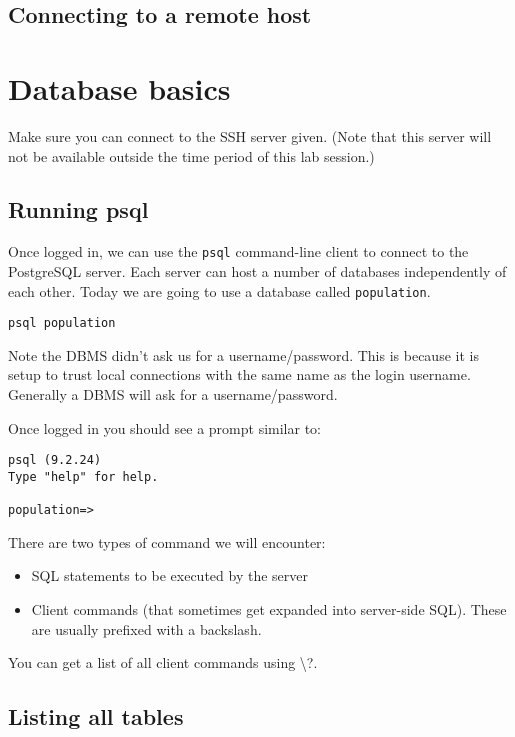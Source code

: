 \documentclass{pgnotes}
\begin{document}
\subsection{Connecting to a remote host}





\section{Database basics}

Make sure you can connect to the SSH server given.
(Note that this server will not be available outside the time period of this lab session.)

\subsection{Running psql}

Once logged in, we can use the \texttt{psql} command-line client to connect to the PostgreSQL server.
Each server can host a number of databases independently of each other.
Today we are going to use a database called \texttt{population}.

\begin{verbatim}
psql population
\end{verbatim}

Note the DBMS didn't ask us for a username/password.
This is because it is setup to trust local connections with the same name as the login username. 
Generally a DBMS will ask for a username/password.

Once logged in you should see a prompt similar to:
\begin{verbatim}
psql (9.2.24)
Type "help" for help.

population=> 
\end{verbatim}

There are two types of command we will encounter:
\begin{itemize}
\item SQL statements to be executed by the server
\item Client commands (that sometimes get expanded into server-side SQL). These are usually prefixed with a backslash. 
\end{itemize}

You can get a list of all client commands using \textbackslash ?.

\subsection{Listing all tables}
\end{document}
